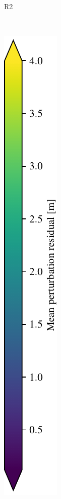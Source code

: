 \begin{figure}[h!]
\begin{center}
\begin{subfigure}[b]{0.3\textwidth}
			\label{fig:R2_pert}
			\caption{R2}
		\end{subfigure}%
		~
		\begin{subfigure}[b]{0.065\textwidth}
			\includegraphics[width=\linewidth]{figs/forest_canyon/colorbar.pdf}

\end{subfigure}
\end{center}
\end{figure}
